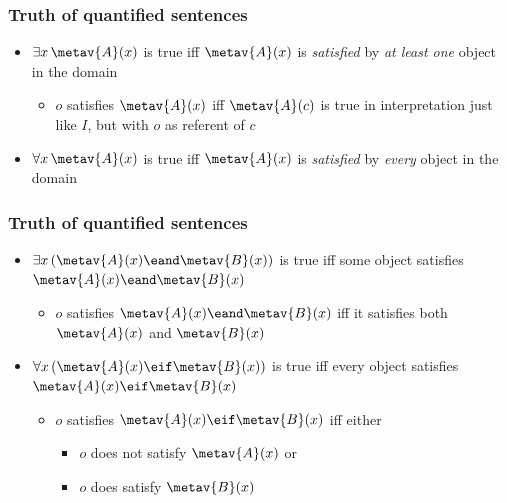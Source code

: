 \begin{frame}
  \frametitle{Truth of quantified sentences}

  \begin{itemize}[<+->]
    \item $\exists x\,\metav{A}(x)$ is true iff $\metav{A}(x)$ is \emph{satisfied} by \emph{at least one} object in the domain
    \begin{itemize}
      \item $o$ satisfies $\metav{A}(x)$ iff $\metav{A}(c)$ is true in interpretation just like $I$, but with $o$ as referent of $c$
    \end{itemize}
    \item $\forall x\,\metav{A}(x)$ is true iff $\metav{A}(x)$ is \emph{satisfied} by \emph{every} object in the domain
  \end{itemize}
\end{frame}

\begin{frame}
  \frametitle{Truth of quantified sentences}

  \begin{itemize}[<+->]
    \item $\exists x\,(\metav{A}(x) \eand \metav{B}(x))$ is true iff some object satisfies $\metav{A}(x) \eand \metav{B}(x)$
    \begin{itemize}
      \item $o$ satisfies $\metav{A}(x) \eand \metav{B}(x)$ iff it satisfies both $\metav{A}(x)$ and $\metav{B}(x)$
    \end{itemize}
    \item $\forall x\,(\metav{A}(x) \eif \metav{B}(x))$ is true iff every object satisfies $\metav{A}(x) \eif \metav{B}(x)$
    \begin{itemize}
      \item $o$ satisfies $\metav{A}(x) \eif \metav{B}(x)$ iff
      either
      \begin{itemize}
        \item $o$ does not satisfy $\metav{A}(x)$ or
        \item $o$ does satisfy $\metav{B}(x)$
      \end{itemize}
    \end{itemize}
  \end{itemize}
\end{frame}



